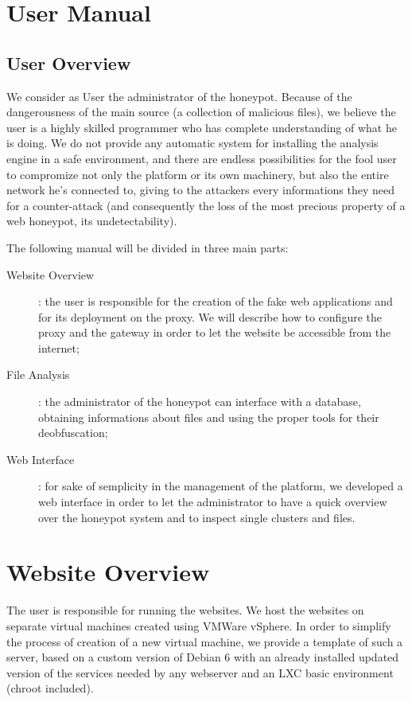 \section{User Manual}

\subsection{User Overview}

We consider as User the administrator of the honeypot. Because of the dangerousness of the main source (a collection of malicious files), we believe the user is a highly skilled programmer who has complete understanding of what he is doing. We do not provide any automatic system for installing the analysis engine in a safe environment, and there are endless possibilities for the fool user to compromize not only the platform or its own machinery, but also the entire network he's connected to, giving to the attackers every informations they need for a counter-attack (and consequently the loss of the most precious property of a web honeypot, its undetectability).

The following manual will be divided in three main parts:
\begin{description}
\item[Website Overview]: the user is responsible for the creation of the fake web applications and for its deployment on the proxy. We will describe how to configure the proxy and the gateway in order to let the website be accessible from the internet;
\item[File Analysis]: the administrator of the honeypot can interface with a database, obtaining informations about files and using the proper tools for their deobfuscation;
\item[Web Interface]: for sake of semplicity in the management of the platform, we developed a web interface in order to let the administrator to have a quick overview over the honeypot system and to inspect single clusters and files.
\end{description}

\section{Website Overview}
\label{sec:websiteOverview}

The user is responsible for running the websites. We host the websites on separate virtual machines created using VMWare vSphere. In order to simplify the process of creation of a new virtual machine, we provide a template of such a server, based on a custom version of Debian 6 with an already installed updated version of the services needed by any webserver and an LXC basic environment (chroot included).

